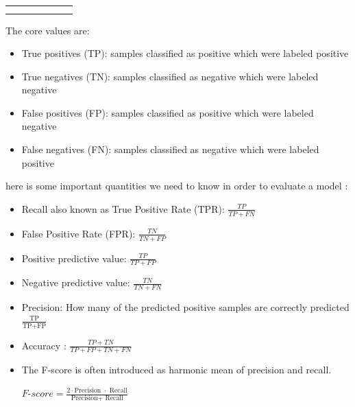 \begin{table}[]
\begin{tabular}{lllclll}
                                                                                                        &                                 & \multicolumn{1}{c}{\textbf{}}                                                                      & \textbf{}                                                                                           & \multicolumn{1}{c}{\textbf{}} &  &  \\
                                                                                                        &                                 & \multicolumn{1}{c}{\textbf{}}                                                                      & \textbf{}                                                                                           & \multicolumn{1}{c}{\textbf{}} &  & 
\end{tabular}
\end{table}


The core values are:
\begin{itemize}
\item True positives (TP): samples classified as positive which were labeled positive
\item True negatives (TN): samples classified as negative which were labeled negative
\item False positives (FP): samples classified as positive which were labeled negative
\item False negatives (FN): samples classified as negative which were labeled positive
\end{itemize}


here is some important quantities we need to know in order to evaluate a model :
\begin{itemize}
\item Recall  also known as True Positive Rate (TPR): $ \frac{TP}{TP+FN}$ 
\item False Positive Rate (FPR): $\frac{TN}{TN+FP}$
\item Positive predictive value:  $\frac{TP}{TP+FP}$ 
\item Negative predictive value: $\frac{TN}{TN+FN}$
\item Precision: How many of the predicted positive samples are correctly predicted   $\frac{\text{TP}}{\text{TP} + \text{FP}}$

\item Accuracy : $\frac{TP+TN}{TP+FP+TN+FN}$

\item The F-score is often introduced as harmonic mean of precision and recall.

$F$-$score= \frac{\text{2} \cdot \text{Precision } \cdot \text{ Recall} }{ \text{Precision} + \text{ Recall}}$



\end{itemize}

